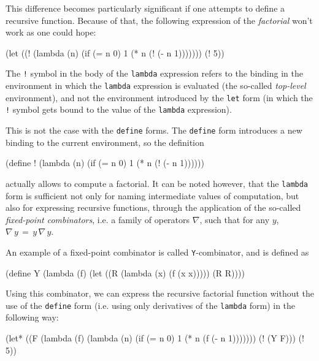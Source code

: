 This difference becomes particularly significant if one attempts
to define a recursive function. Because of that, the following
expression of the \textit{factorial} won't work as one could hope:

\begin{Snippet}
(let ((! (lambda (n)
           (if (= n 0)
             1
             (* n (! (- n 1)))))))
  (! 5))
\end{Snippet}

The \texttt{!} symbol in the body of the \texttt{lambda} expression
refers to the binding in the environment in which the \texttt{lambda}
expression is evaluated (the so-called \emph{top-level} environment),
and not the environment introduced by the \texttt{let} form (in which
the \texttt{!} symbol gets bound to the value of the \texttt{lambda}
expression).

This is not the case with the \texttt{define} forms. The \texttt{define}
form introduces a new binding to the current environment, so the
definition

\begin{Snippet}
(define ! (lambda (n)
            (if (= n 0)
              1
              (* n (! (- n 1))))))
\end{Snippet}

actually allows to compute a factorial. It can be noted
however\cite{Harrison1997}, that the \texttt{lambda} form is sufficient
not only for naming intermediate values of computation, but also for
expressing recursive functions, through the application of the so-called
\textit{fixed-point combinators}, i.e. a family of operators $\nabla$, such
that for any $y$, $\nabla\,y\,=\,y\,\nabla\,y$.

An example of a fixed-point combinator is called \texttt{Y}-combinator, and is
defined as
\begin{Snippet}
(define Y (lambda (f)
            (let ((R (lambda (x) (f (x x)))))
              (R R))))
\end{Snippet}

Using this combinator, we can express the recursive factorial function
without the use of the \texttt{define} form (i.e. using only derivatives
of the \texttt{lambda} form) in the following way:

\begin{Snippet}
(let* ((F (lambda (f)
            (lambda (n)
              (if (= n 0)
                1
                (* n (f (- n 1)))))))
       (! (Y F)))
  (! 5))
\end{Snippet}

